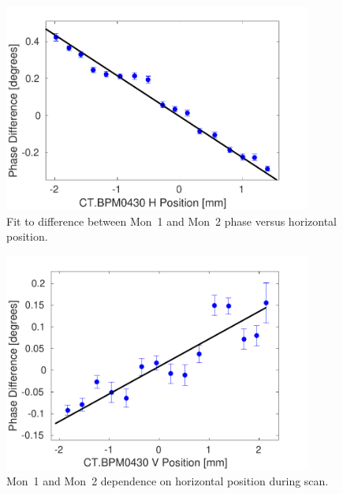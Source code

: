 \begin{figure}
  \centering
  \includegraphics[width=0.9\textwidth]{Figures/phaseMons/horizontalScanFit}
  \caption{Fit to difference between Mon~1 and Mon~2 phase versus horizontal position.}
  \label{f:horizontalScanFit}
\end{figure}

\begin{figure}
  \centering
  \includegraphics[width=0.9\textwidth]{Figures/phaseMons/verticalScanFit}
  \caption{Mon~1 and Mon~2 dependence on horizontal position during scan.}
  \label{f:verticalScanFit}
\end{figure}